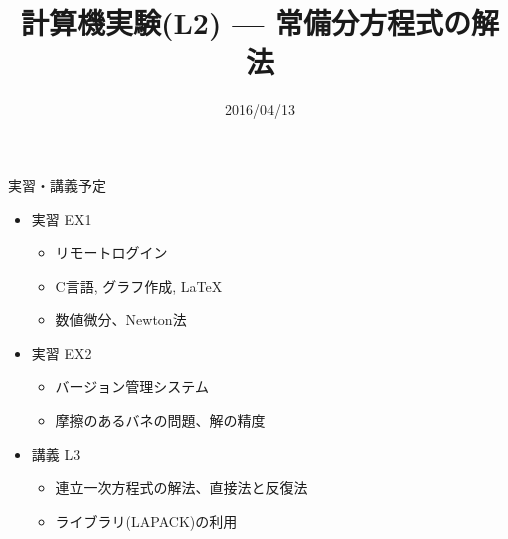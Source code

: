 \documentclass[dvipdfmx]{beamer}
\title{計算機実験(L2) --- 常備分方程式の解法}
\date{2016/04/13}
\begin{document}
\begin{frame}
  \titlepage
  \tableofcontents
\end{frame}






\section{}
\begin{frame}[t,fragile]{実習・講義予定}
  \begin{itemize}
    \setlength{\itemsep}{1em}
  \item 実習 EX1
    \begin{itemize}
    \item リモートログイン
    \item C言語, グラフ作成, \LaTeX
    \item 数値微分、Newton法
    \end{itemize}
  \item 実習 EX2
    \begin{itemize}
    \item バージョン管理システム
    \item 摩擦のあるバネの問題、解の精度
    \end{itemize}
  \item 講義 L3
    \begin{itemize}
    \item 連立一次方程式の解法、直接法と反復法
    \item ライブラリ(LAPACK)の利用
    \end{itemize}
  \end{itemize}
\end{frame}
\end{document}
